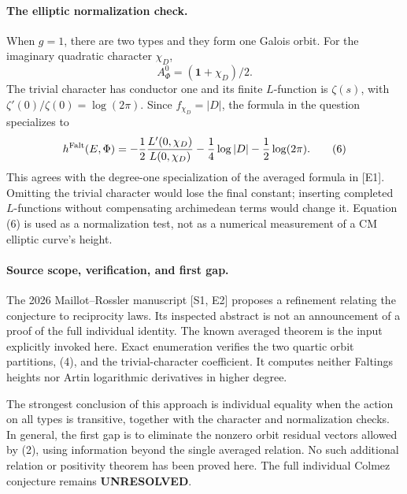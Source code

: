 \documentclass[11pt]{article}
\begin{document}
\paragraph{The elliptic normalization check.}
When $g=1$, there are two types and they form one Galois orbit.
For the imaginary quadratic character $\chi_D$,
\[
 A_\Phi^0=(\mathbf1+\chi_D)/2.
\]
The trivial character has conductor one and its finite $L$-function is
$\zeta(s)$, with $\zeta'(0)/\zeta(0)=\log(2\pi)$. Since
$f_{\chi_D}=|D|$, the formula in the question specializes to
\[
 h^{\rm Falt}(E,\Phi)=
 -\frac12\frac{L'(0,\chi_D)}{L(0,\chi_D)}
 -\frac14\log|D|-\frac12\log(2\pi).                 \tag{6}
\]
This agrees with the degree-one specialization of the averaged formula
in [E1]. Omitting the trivial character would lose the final constant;
inserting completed $L$-functions without compensating archimedean
terms would change it. Equation (6) is used as a normalization test,
not as a numerical measurement of a CM elliptic curve's height.

\paragraph{Source scope, verification, and first gap.}
The 2026 Maillot--Rossler manuscript [S1, E2] proposes a refinement
relating the conjecture to reciprocity laws. Its inspected abstract is
not an announcement of a proof of the full individual identity. The
known averaged theorem is the input explicitly invoked here. Exact
enumeration verifies the two quartic orbit partitions, (4), and the
trivial-character coefficient. It computes neither Faltings heights
nor Artin logarithmic derivatives in higher degree.

The strongest conclusion of this approach is individual equality when
the action on all types is transitive, together with the character and
normalization checks. In general, the first gap is to eliminate the
nonzero orbit residual vectors allowed by (2), using information beyond
the single averaged relation. No such additional relation or positivity
theorem has been proved here. The full individual Colmez conjecture
remains \textbf{UNRESOLVED}.
\end{document}
